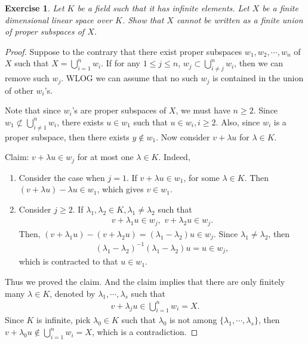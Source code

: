 \documentclass[10pt]{book}
\newtheorem{exercise}{Exercise}[section]
\theoremstyle{definition}
\numberwithin{equation}{chapter}
\begin{document}
\medskip

\begin{exercise}
Let $K$ be a field such that it has infinite elements. Let $X$ be a finite dimensional linear space over $K$. Show that $X$ cannot be written as a finite union of proper subspaces of $X$.
\end{exercise}
\begin{proof}
Suppose to the contrary that there exist proper subspaces $w_1, w_2, \cdots, w_n$ of $X$ such that $X = \bigcup^n_{i=1}w_i$. If for any $1 \leq j \leq n$, $w_j \subset \bigcup^n_{i\neq j}w_i$, then we can remove such $w_j$. WLOG we can assume that no such $w_j$ is contained in the union of other $w_i$'s. 

Note that since $w_i$'s are proper subspaces of $X$, we must have $n \geq 2$. Since $w_1 \not\subset \bigcup^n_{i\neq 1}w_i$, there exists $u \in w_1$ such that $u \in w_i, i \geq 2$. Also, since $w_i$ is a proper subspace, then there exists $y \notin w_1$. Now consider $v + \lambda u$ for $\lambda \in K$.

Claim: $v + \lambda u \in w_j$ for at most one $\lambda \in K$. Indeed,
\begin{enumerate}[label=(\alph*)]
    \item Consider the case when $j = 1$. If $v + \lambda u \in w_1$, for some $\lambda \in K$. Then $(v + \lambda u) - \lambda u \in w_1$, which gives $v \in w_1$. 
    
    \item Consider $j \geq 2$. If $\lambda_1, \lambda_2 \in K, \lambda_1 \neq \lambda_2$ such that 
    \begin{align*}
        v + \lambda_1 u \in w_j, \,\, v + \lambda_2 u \in w_j.
    \end{align*}
    Then, $\left(v + \lambda_1 u\right) - \left(v + \lambda_2 u\right) = \left(\lambda_1 - \lambda_2\right)u \in w_j$. Since $\lambda_1 \neq \lambda_2$, then 
    \begin{align*}
        \left(\lambda_1 - \lambda_2\right)^{-1}\left(\lambda_1 - \lambda_2\right) u = u \in w_j,
    \end{align*}
    which is contracted to that $u \in w_1$.
\end{enumerate}
Thus we proved the claim. And the claim implies that there are only finitely many $\lambda \in K$, denoted by $\lambda_1, \cdots, \lambda_s$ such that
\begin{align*}
    v + \lambda_j u \in \bigcup^n_{i=1}w_i = X.
\end{align*}
Since $K$ is infinite, pick $\lambda_0 \in K$ such that $\lambda_0$ is not among $\{\lambda_1, \cdots, \lambda_s\}$, then $v + \lambda_0 u \notin \bigcup^n_{i=1}w_i = X$, which is a contradiction.
\end{proof}
\end{document}
